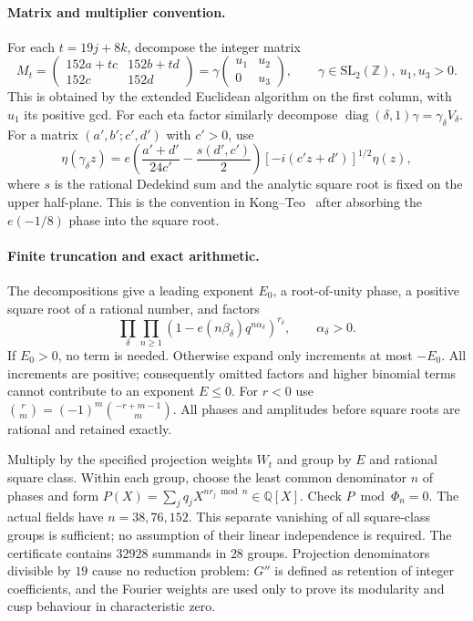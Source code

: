 \documentclass[11pt]{article}
\theoremstyle{remark}\newtheorem{remark}[theorem]{Remark}
\begin{document}
\paragraph{Matrix and multiplier convention.}
For each $t=19j+8k$, decompose the integer matrix
\[M_t=\begin{pmatrix}152a+tc&152b+td\\152c&152d\end{pmatrix}
=\gamma\begin{pmatrix}u_1&u_2\\0&u_3\end{pmatrix},\qquad \gamma\in\mathrm{SL}_2(\mathbb Z),\ u_1,u_3>0.
\]
This is obtained by the extended Euclidean algorithm on the first column, with $u_1$ its positive gcd. For each eta factor similarly decompose $\operatorname{diag}(\delta,1)\gamma=\gamma_\delta V_\delta$. For a matrix $(a',b';c',d')$ with $c'>0$, use
\[\eta(\gamma_\delta z)=e\!\left(\frac{a'+d'}{24c'}-\frac{s(d',c')}{2}\right)
[-i(c'z+d')]^{1/2}\eta(z),\]
where $s$ is the rational Dedekind sum and the analytic square root is fixed on the upper half-plane. This is the convention in Kong--Teo~\cite[Eq.~(1.2)]{KT} after absorbing the $e(-1/8)$ phase into the square root.

\paragraph{Finite truncation and exact arithmetic.}
The decompositions give a leading exponent $E_0$, a root-of-unity phase, a positive square root of a rational number, and factors
\[\prod_{\delta}\prod_{n\ge1}(1-e(n\beta_\delta)q^{n\alpha_\delta})^{r_\delta},
\qquad \alpha_\delta>0.\]
If $E_0>0$, no term is needed. Otherwise expand only increments at most $-E_0$. All increments are positive; consequently omitted factors and higher binomial terms cannot contribute to an exponent $E\le0$. For $r<0$ use $\binom r m=(-1)^m\binom{-r+m-1}m$. All phases and amplitudes before square roots are rational and retained exactly.

Multiply by the specified projection weights $W_t$ and group by $E$ and rational square class. Within each group, choose the least common denominator $n$ of phases and form $P(X)=\sum_j q_j X^{nr_j\bmod n}\in\mathbb Q[X]$. Check $P\bmod\Phi_n=0$. The actual fields have $n=38,76,152$. This separate vanishing of all square-class groups is sufficient; no assumption of their linear independence is required. The certificate contains $32928$ summands in $28$ groups. Projection denominators divisible by $19$ cause no reduction problem: $G''$ is defined as retention of integer coefficients, and the Fourier weights are used only to prove its modularity and cusp behaviour in characteristic zero.
\end{document}
